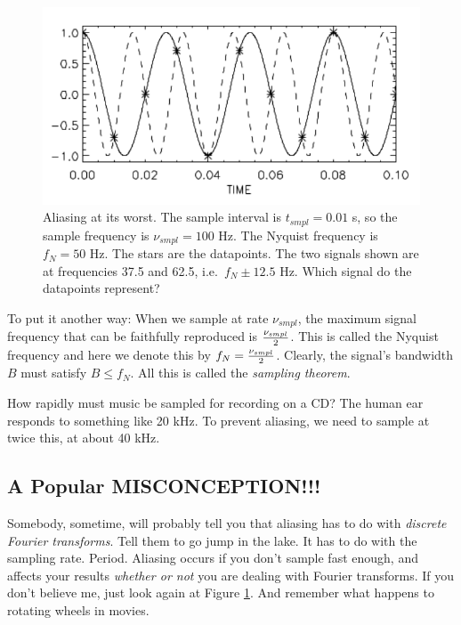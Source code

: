 \documentclass[preprint]{aastex}
\begin{document}
\begin{figure}[H]
\begin{center}
\leavevmode
 \includegraphics[width=6.0in, clip=true]{fig1}
\end{center}
\label{figone}
\caption{Aliasing at its worst. The sample interval is $t_{smpl}= 0.01$
s, so the sample frequency is $\nu_{smpl} = 100$ Hz. The Nyquist
frequency is $f_N=50$ Hz. The stars are the datapoints. The two signals
shown are at frequencies 37.5 and 62.5, i.e.\ $f_N \pm 12.5$ Hz. Which
signal do the datapoints represent?  }
\end{figure}

	To put it another way: When we sample at rate $\nu_{smpl}$, the
maximum signal frequency that can be faithfully reproduced is
$\nu_{smpl} \over 2$.  This is called the Nyquist frequency and here we
denote this by $f_N = {\nu_{smpl} \over 2}$.  Clearly, the signal's
bandwidth $B$ must satisfy $B \le f_N$. All this is called the {\it
sampling theorem}.

	How rapidly must music be sampled for recording on a CD? The
human ear responds to something like 20 kHz.  To prevent aliasing, we
need to sample at twice this, at about 40 kHz. 

\subsection {A Popular MISCONCEPTION!!!}

	Somebody, sometime, will probably tell you that aliasing has to
do with {\it discrete Fourier transforms}.  Tell them to go jump in the
lake.  It has to do with the sampling rate.  Period.  Aliasing occurs if
you don't sample fast enough, and affects your results {\it whether or
not} you are dealing with Fourier transforms.  If you don't believe me,
just look again at Figure \ref{figone}. And remember what happens to rotating
wheels in movies. 
\end{document}
